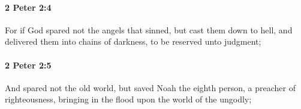 		\paragraph{2 Peter 2:4} %
			\label{2PETER-2-4}

			For if God spared not the angels that sinned, but cast them down to hell, and delivered them into chains of darkness, to be reserved unto judgment;

			\begin{framed}
			\scriptsize
				\begin{compactdesc}
					\item[SBLG] 
				\end{compactdesc}
			\end{framed}

		\paragraph{2 Peter 2:5} %
			\label{2PETER-2-5}

			And spared not the old world, but saved Noah the eighth person, a preacher of righteousness, bringing in the flood upon the world of the ungodly;

